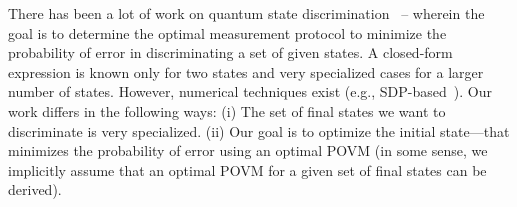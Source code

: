 
There has been a lot of work on quantum state discrimination~\cite{bergou-review-2007,bergou2004,Bae_2015,Barnett-review} -- wherein the goal is to determine the 
optimal measurement protocol to minimize the probability of error
in discriminating a set of given states. 
A closed-form expression is known only for two states and very specialized cases for a larger
number of states. However, numerical techniques exist (e.g., SDP-based~\cite {semidefinite}).
Our work differs in the following ways: (i) The set of final states we want to discriminate is very 
specialized. (ii) Our goal is to optimize the initial state---that minimizes the probability of error using an optimal POVM (in some sense, we implicitly assume that an optimal POVM for a given set of final states can be derived). 






